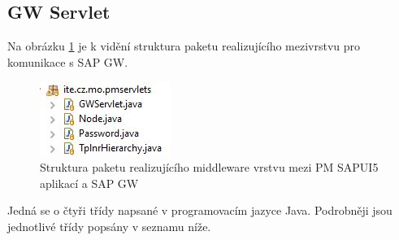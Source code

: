 \documentclass[thesis=M,czech]{FITthesis}[2012/06/26]
\begin{document}
\subsection{GW Servlet}
Na obrázku \ref{img:gw_servlet_structure} je k vidění struktura paketu realizujícího mezivrstvu pro komunikace s SAP GW. 
\begin{figure}[H]
	\centering
	\includegraphics[]{images/gw_servlet_structure}
	\caption{Struktura paketu realizujícího middleware vrstvu mezi PM SAPUI5 aplikací a SAP GW}
	\label{img:gw_servlet_structure}
\end{figure}
Jedná se o čtyři třídy napsané v programovacím jazyce Java. Podrobněji jsou jednotlivé třídy popsány v seznamu níže.
\end{document}
